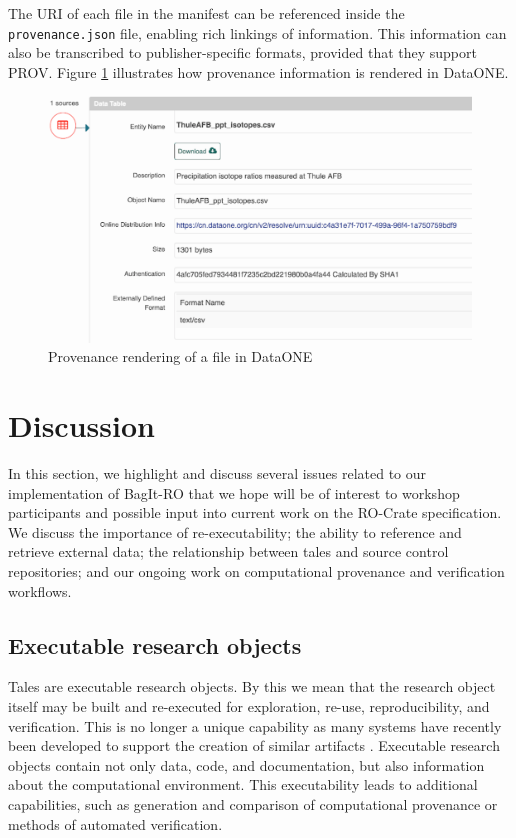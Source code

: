 \documentclass[conference]{IEEEtran}
\begin{document}
The URI of each file in the manifest can be referenced inside the
\texttt{provenance.json} file, enabling rich linkings of
information. This information can also be transcribed to
publisher-specific formats, provided that they support PROV. Figure
\ref{prov-fig} illustrates how provenance information is rendered in
DataONE.

\begin{figure}
\centering
\includegraphics[scale=0.4]{images/dataone-prov.png}
\caption{Provenance rendering of a file in DataONE}
\label{prov-fig}
\end{figure}


\section{Discussion} \label{discussion}

In this section, we highlight and discuss several issues related to our implementation of BagIt-RO that we hope will be of interest to workshop participants and possible input into current work on the RO-Crate specification. We discuss the importance of re-executability; the ability to reference and retrieve external data; the relationship between tales and source control repositories; and our ongoing work on computational provenance and verification workflows.

\subsection{Executable research objects}
Tales are executable research objects. By this we mean that the
research object itself may be built and re-executed for exploration,
re-use, reproducibility, and verification. This is no longer  a unique capability as many systems have recently been developed to support the creation of similar artifacts \cite{Chirigati2016, Binder2018, Yuan2018}. Executable research objects contain not only data, code, and documentation, but also information about the computational environment. This executability leads to additional capabilities, such as generation and comparison of computational provenance or methods of automated verification.
\end{document}
